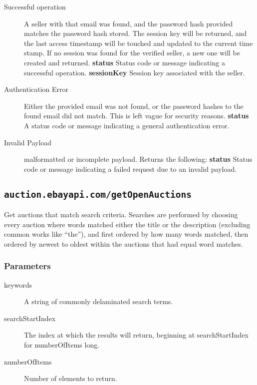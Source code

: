 \documentclass{article}
\newcommand{\code}[1]{\colorbox{light-gray}{\texttt{#1}}}
\begin{document}
\begin{description}
    \item[Successful operation] A seller with that email was found, and the
        password hash provided matches the password hash stored. The session
        key will be returned, and the last access timestamp will be touched and
        updated to the current time stamp. If no session was found for the
        verified seller, a new one will be created and returned.
        \subitem\textbf{status} Status code or message indicating a successful
        operation.
        \subitem\textbf{sessionKey} Session key associated with the seller.

    \item[Authentication Error] Either the provided email was not found, or the
        password hashes to the found email did not match. This is left vague
        for security reasons.
        \subitem\textbf{status} A status code or message indicating a general
        authentication error.

    \item[Invalid Payload] malformatted or incomplete payload. Returns the
        following:
        \subitem\textbf{status} Status code or message indicating a failed
        request due to an invalid payload.
\end{description}


\subsection{\code{auction.ebayapi.com/getOpenAuctions}}
Get auctions that match search criteria. Searches are performed by choosing
every auction where words matched either the title or the description
(excluding common works like ``the''), and first ordered by how many words
matched, then ordered by newest to oldest within the auctions that had equal
word matches.

\subsubsection{Parameters}

\begin{description}
    \item[keywords] A string of commonly delaminated search terms.
    \item[searchStartIndex] The index at which the results will return, beginning at searchStartIndex for numberOfItems long.
    \item[numberOfItems] Number of elements to return.
\end{description}
\end{document}
